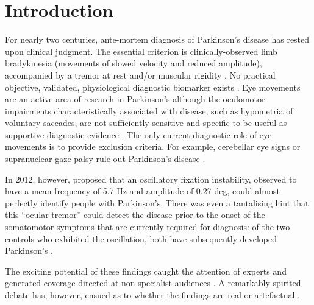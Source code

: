 \documentclass[jou,a4paper]{apa6}
\begin{document}
\section{Introduction}

For nearly two centuries, ante-mortem diagnosis of Parkinson's disease has rested upon clinical judgment. The essential criterion is clinically-observed limb bradykinesia (movements of slowed velocity and reduced amplitude), accompanied by a tremor at rest and/or muscular rigidity \citep{Postuma2015MDS-clinical-di}. No practical objective, validated, physiological diagnostic biomarker exists \citep{Sharma2013Biomarkers-in-P}. Eye movements are an active area of research in  Parkinson's \citep{MacAskill2016Eye-movements-i} although the oculomotor impairments characteristically associated with disease, such as hypometria of voluntary saccades, are not sufficiently sensitive and specific to be useful as supportive diagnostic evidence \citep{Kimmig2002What-is-patholo,Anderson2013Eye-movements-i}. The only current diagnostic role of eye movements is to provide exclusion criteria. For example, cerebellar eye signs or supranuclear gaze palsy rule out Parkinson's disease \citep{Postuma2015MDS-clinical-di,Hughes1992Accuracy-of-cli}. 

In 2012, however, \citeauthor{Gitchel2012Pervasive-ocula} proposed that an oscillatory fixation instability, observed to have a mean frequency of 5.7 Hz and amplitude of 0.27 deg, could almost perfectly identify people with Parkinson's. There was even a tantalising hint that this ``ocular tremor'' could detect the disease prior to the onset of the somatomotor symptoms that are currently required for diagnosis: of the two controls who exhibited the oscillation, both have subsequently developed Parkinson's \citep{Gitchel2014Experimental-su}.

The exciting potential of these findings caught the attention of experts \citep{Leigh2013Tremor-of-the-e, Willard2014Ocular-motor-di, Bronstein2014EYEE:-exciting-} and generated coverage directed at non-specialist audiences \citep{In-Brief2012Ocular-Tremor-i,Phend2012Eye-tremors-may}. A remarkably spirited debate has, however, ensued as to whether the findings are real \citep{Baron2013Ocular-tremor-i,Baron2014Scientific-data,Duval2013Ocular-tremor-i,Gitchel2014Experimental-su} or artefactual \citep{Kaski2013Eye-oscillation,Kaski2013Ocular-tremor-i,MacAskill2013Ocular-tremor-i,Saifee2014Tremor-of-the-e}. 
\end{document}
